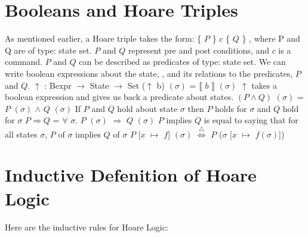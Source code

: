 \documentclass{lecturenotes}
\begin{document}
\section{Booleans and Hoare Triples}
As mentioned earlier, a Hoare triple takes the form: \{ $P$ \} $c$ \{ $Q$ \} , where P and Q are of type: state \rightarrow \; set.
$P$ and $Q$ represent pre and post conditions, and $c$ is a command. $P$ and $Q$ can be described as predicates of type: state \rightarrow \; set.
We can write boolean expressions about the state, \sigma \; , and its relations to the predicates, $P$ and $Q$. \newline
\newline
$\uparrow$ : Bexpr $\rightarrow$ State $\rightarrow$ Set \newline
($\uparrow$ b) $(\sigma)$ = $\llbracket$ $b$ $\rrbracket$ $(\sigma)$ \newline
\newline
$\uparrow$ takes a boolean expression and gives us back a predicate about states. \newline
\newline
$(P \wedge Q)$ $(\sigma)$ = $P$ $(\sigma)$ $\wedge$ $Q$ $(\sigma)$ \newline
If $P$ and $Q$ hold about state $\sigma$ then $P$ holds for $\sigma$ and $Q$ hold for $\sigma$ \newline
\newline
$P \Rightarrow Q$ = $\forall$ $\sigma$. $P$ $(\sigma)$ $\Rightarrow$ $Q$ $(\sigma)$ \newline
$P$ implies $Q$ is equal to saying that for all states $\sigma$, $P$ of $\sigma$ implies $Q$ of $\sigma$ \newline
\newline
$P$ [$x$ $\mapsto$ $f$] $(\sigma)$ $\stackrel{\triangle}{\iff}$ $P$ ($\sigma$ [$x$ $\mapsto$ $f(\sigma)$]) \newline \newline


\section{Inductive Defenition of Hoare Logic}
Here are the inductive rules for Hoare Logic:
\begin{mathpar}
\end{mathpar}
\end{document}
